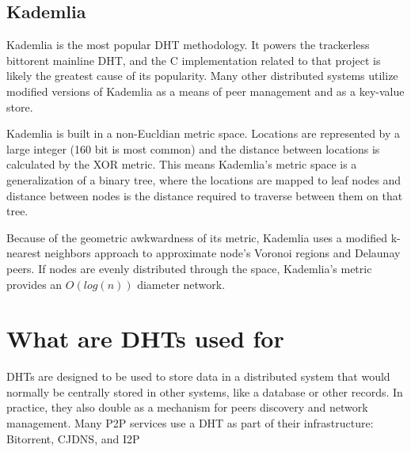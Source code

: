 \subsection{Kademlia}

Kademlia is the most popular DHT methodology. 
It powers the trackerless bittorent mainline DHT, and the C implementation related to that project is likely the greatest cause of its popularity.
Many other distributed systems utilize modified versions of Kademlia as a means of peer management and as a key-value store.

Kademlia is built in a non-Eucldian metric space. 
Locations are represented by a large integer (160 bit is most common) and the distance between locations is calculated by the XOR metric.
This means Kademlia's metric space is a generalization of a binary tree, where the locations are mapped to leaf nodes and distance between nodes is the distance required to traverse between them on that tree.

Because of the geometric awkwardness of its metric, Kademlia uses a modified k-nearest neighbors approach to approximate node's Voronoi regions and Delaunay peers.
If nodes are evenly distributed through the space, Kademlia's metric provides an $O(log(n))$ diameter network.


\section{What are DHTs used for}

DHTs are designed to be used to store data in a distributed system that would normally be centrally stored in other systems, like a database or other records.
In practice, they also double as a mechanism for peers discovery and network management.
Many P2P services use a DHT as part of their infrastructure: Bitorrent\cite{jimenez2011kademlia}, CJDNS\cite{hodson2013meshnet}, and I2P\cite{zantout2011i2p}
